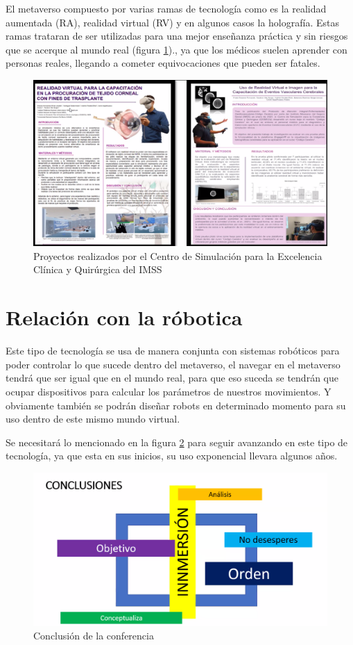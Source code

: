 \documentclass[12pt]{article}
\begin{document}
El metaverso compuesto por varias ramas de tecnología como es la realidad aumentada (RA), realidad virtual (RV) y en algunos casos la holografía. Estas ramas trataran de ser utilizadas para una mejor enseñanza práctica y sin riesgos que se acerque al mundo real (figura \ref{img_3})., ya que los médicos suelen aprender con personas reales, llegando a cometer equivocaciones que pueden ser fatales.

 	\begin{figure}[h]
	\centering
	\includegraphics[width=14.3cm]{img_3}
	\caption{Proyectos realizados por el Centro de Simulación para la Excelencia Clínica y Quirúrgica del IMSS}
	\label{img_3}	
\end{figure}


    \section{Relación con la róbotica}
Este tipo de tecnología se usa de manera conjunta con sistemas robóticos para poder controlar lo que sucede dentro del metaverso, el navegar en el metaverso tendrá que ser igual que en el mundo real, para que eso suceda se tendrán que ocupar dispositivos para calcular los parámetros de nuestros movimientos. Y obviamente también se podrán diseñar robots en determinado momento para su uso dentro de este mismo mundo virtual. \\\vspace{0.1cm}

Se necesitará lo mencionado en la figura \ref{img_4} para seguir avanzando en este tipo de tecnología, ya que esta en sus inicios, su uso exponencial llevara algunos años. 

		\begin{figure}[h]
		\centering
		\includegraphics[width=15cm]{img_4}
		\caption{Conclusión de la conferencia}
		\label{img_4}	
	\end{figure}
		
 
	
\end{document}
